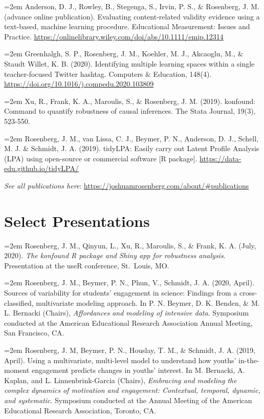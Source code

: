 \documentclass[11pt, a4paper]{awesome-cv}
\begin{document}
\hangindent=2em
Anderson, D. J., Rowley, B., Stegenga, S., Irvin, P. S., \& Rosenberg, J. M. (advance online publication). Evaluating content-related validity evidence using a text-based, machine learning procedure. Educational Measurement: Issues and Practice. \url{https://onlinelibrary.wiley.com/doi/abs/10.1111/emip.12314}

\hangindent=2em
Greenhalgh, S. P., Rosenberg, J. M., Koehler, M. J., Akcaoglu, M., \& Staudt Willet, K. B. (2020). Identifying multiple learning spaces within a single teacher-focused Twitter hashtag. Computers \& Education, 148(4). \url{https://doi.org/10.1016/j.compedu.2020.103809}

\hangindent=2em
Xu, R., Frank, K. A., Maroulis, S., \& Rosenberg, J. M. (2019). konfound: Command to quantify robustness of causal inferences. The Stata Journal, 19(3), 523-550.

\hangindent=2em
Rosenberg, J. M., van Lissa, C. J., Beymer, P. N., Anderson, D. J., Schell, M. J. \& Schmidt, J. A. (2019). tidyLPA: Easily carry out Latent Profile Analysis (LPA) using open-source or commercial software {[}R package{]}. \url{https://data-edu.github.io/tidyLPA/}

\emph{See all publications here}: \url{https://joshuamrosenberg.com/about/\#publications}

\hypertarget{select-presentations}{%
\section{Select Presentations}\label{select-presentations}}

\hangindent=2em
Rosenberg, J. M., Qinyun, L., Xu, R., Maroulis, S., \& Frank, K. A. (July, 2020). \emph{The konfound R package and Shiny app for robustness analysis}. Presentation at the useR conference, St.~Louis, MO.

\hangindent=2em
Rosenberg, J. M., Beymer, P. N., Phun, V., Schmidt, J. A. (2020, April). Sources of variability for students' engagement in science: Findings from a cross-classified, multivariate modeling approach. In P. N. Beymer, D. K. Benden, \& M. L. Bernacki (Chairs), \emph{Affordances and modeling of intensive data}. Symposium conducted at the American Educational Research Association Annual Meeting, San Francisco, CA.

\hangindent=2em
Rosenberg, J. M, Beymer, P. N., Houslay, T. M., \& Schmidt, J. A. (2019, April). Using a multivariate, multi-level model to understand how youths' in-the-moment engagement predicts changes in youths' interest. In M. Bernacki, A. Kaplan, and L. Linnenbrink-Garcia (Chairs), \emph{Embracing and modeling the complex dynamics of motivation and engagement: Contextual, temporal, dynamic, and systematic}. Symposium conducted at the Annual Meeting of the American Educational Research Association, Toronto, CA.
\end{document}
